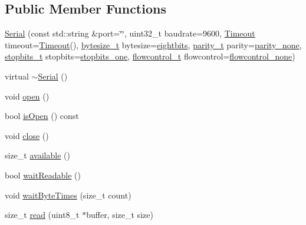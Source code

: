 \subsection*{Public Member Functions}
\begin{DoxyCompactItemize}
\item 
\mbox{\hyperlink{classserial_1_1_serial_aecbc4cc1723143805ae5a4aa79ba9332}{Serial}} (const std\+::string \&port=\char`\"{}\char`\"{}, uint32\+\_\+t baudrate=9600, \mbox{\hyperlink{structserial_1_1_timeout}{Timeout}} timeout=\mbox{\hyperlink{structserial_1_1_timeout}{Timeout}}(), \mbox{\hyperlink{namespaceserial_a00b3281fa11cea770c0b0c8a106080f8}{bytesize\+\_\+t}} bytesize=\mbox{\hyperlink{namespaceserial_a00b3281fa11cea770c0b0c8a106080f8a47f14d952cf9bed6c3f7ae5985161990}{eightbits}}, \mbox{\hyperlink{namespaceserial_a8f45d26bf7c9a06659e75b5004a50481}{parity\+\_\+t}} parity=\mbox{\hyperlink{namespaceserial_a8f45d26bf7c9a06659e75b5004a50481a31cbb2b3cf0870d1a089d66295918416}{parity\+\_\+none}}, \mbox{\hyperlink{namespaceserial_af5b116611d6628a3aa8f788fdc09f469}{stopbits\+\_\+t}} stopbits=\mbox{\hyperlink{namespaceserial_af5b116611d6628a3aa8f788fdc09f469ab70806555a14cb43e5cc43f6f3d01157}{stopbits\+\_\+one}}, \mbox{\hyperlink{namespaceserial_a93ef57a314b4e562f9eded6c15d34351}{flowcontrol\+\_\+t}} flowcontrol=\mbox{\hyperlink{namespaceserial_a93ef57a314b4e562f9eded6c15d34351a083bc02a6e8e7c6540a28654c0f95bb0}{flowcontrol\+\_\+none}})
\item 
virtual \mbox{\hyperlink{classserial_1_1_serial_a5b32c394c0ff923a4ef1c13cfb20a6ba}{$\sim$\+Serial}} ()
\item 
void \mbox{\hyperlink{classserial_1_1_serial_af3644ed1a9d899b70e9d63bb9b808d62}{open}} ()
\item 
bool \mbox{\hyperlink{classserial_1_1_serial_a5b4069da8ec84ee4331d0690b325d08d}{is\+Open}} () const
\item 
void \mbox{\hyperlink{classserial_1_1_serial_afbe59407e718bc3d22ea4a67b304db6c}{close}} ()
\item 
size\+\_\+t \mbox{\hyperlink{classserial_1_1_serial_afafe25b2f3bb0809550abdc72c51a234}{available}} ()
\item 
bool \mbox{\hyperlink{classserial_1_1_serial_ad6e395bfe91718b66f6695c10ee90e5b}{wait\+Readable}} ()
\item 
void \mbox{\hyperlink{classserial_1_1_serial_a318262c05074a9da15d410f8af29c15c}{wait\+Byte\+Times}} (size\+\_\+t count)
\item 
size\+\_\+t \mbox{\hyperlink{classserial_1_1_serial_a0261dbfb9361784ecb3eee98b85fa103}{read}} (uint8\+\_\+t $\ast$buffer, size\+\_\+t size)

\end{DoxyCompactItemize}
